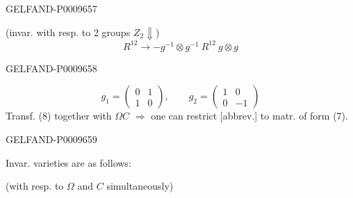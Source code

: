 \begin{GelfandAdjacentEvidence}{GELFAND-P000965}{7}


(invar. with resp. to 2 groups $Z_2\Downarrow$)
\begin{equation*}
 R^{12}\longrightarrow-g^{-1}\otimes g^{-1}\ R^{12}\ g\otimes g\tag{8}
\end{equation*}
\end{GelfandAdjacentEvidence}
\begin{GelfandAdjacentEvidence}{GELFAND-P000965}{8}

\begin{equation*}
 g_1=\begin{pmatrix}0&1\\1&0\end{pmatrix},\qquad
 g_2=\begin{pmatrix}1&0\\0&-1\end{pmatrix}\tag{9}
\end{equation*}
Transf. (8) together with $\Omega C$ $\Rightarrow$ one can restrict [abbrev.] to matr. of form (7).
\end{GelfandAdjacentEvidence}
\begin{GelfandAdjacentEvidence}{GELFAND-P000965}{9}


Invar. varieties are as follows:
\end{GelfandAdjacentEvidence}


(with resp. to $\Omega$ and $C$ simultaneously)

